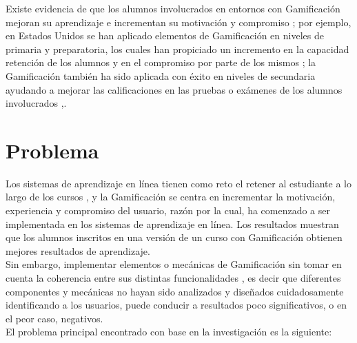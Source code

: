     \noindent Existe evidencia de que los alumnos involucrados en entornos con Gamificación mejoran su aprendizaje e incrementan su motivación y compromiso \cite{education4}; %
    por ejemplo, en Estados Unidos se han aplicado elementos de Gamificación en niveles de primaria y preparatoria, los cuales han propiciado un incremento en la capacidad retención de los alumnos y en el compromiso por parte de los mismos \cite{education3}; %
    la Gamificación también ha sido aplicada con éxito en niveles de secundaria ayudando a mejorar las calificaciones en las pruebas o exámenes de los alumnos involucrados \cite{education2},\cite{education5}. %

\section{Problema}
\label{sec:problematica}

    Los sistemas de aprendizaje en línea tienen como reto el retener al estudiante a lo largo de los cursos \cite{problematica1}, y la Gamificación se centra en incrementar la motivación, experiencia y compromiso del usuario, razón por la cual, ha comenzado a ser implementada en los sistemas de aprendizaje en línea. Los resultados muestran que los alumnos inscritos en una versión de un curso con Gamificación obtienen mejores resultados de aprendizaje. \cite{problematica2}\\
    
    \noindent Sin embargo, implementar elementos o mecánicas de Gamificación sin tomar en cuenta la coherencia entre sus distintas funcionalidades \cite{FrameWorkForTheWin}, es decir que diferentes componentes y mecánicas no hayan sido analizados y diseñados cuidadosamente identificando a los usuarios, puede conducir a resultados poco significativos, o en el peor caso, negativos. \cite{problematica3}\\
    
    \noindent El problema principal encontrado con base en la investigación %
    es la siguiente:
    
